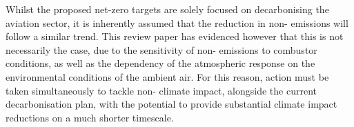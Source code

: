 Whilst the proposed net-zero targets are solely focused on decarbonising the aviation sector, it is inherently assumed that the reduction in non- emissions will follow a similar trend. This review paper has evidenced however that this is not necessarily the case, due to the sensitivity of non- emissions to combustor conditions, as well as the dependency of the atmospheric response on the environmental conditions of the ambient air. For this reason, action must be taken simultaneously to tackle non- climate impact, alongside the current decarbonisation plan, with the potential to provide substantial climate impact reductions on a much shorter timescale.





